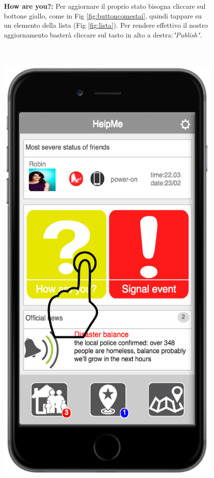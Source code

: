  
\begin{figure}
\textbf{How are you?:} Per aggiornare il proprio stato bisogna cliccare sul bottone giallo, come in Fig \ref{fig:buttoncomestai}, quindi tappare su un elemento della lista (Fig \ref{fig:lista}). Per rendere effettivo il nostro aggiornamento basterà cliccare sul tasto in alto a destra:\textit{"Publish"}.
\\ \\ \\
 \begin{minipage}[b]{6cm}
   \centering
  \includegraphics[scale=0.6]{interfaccia/tapbuttoncomestai.png}

\end{minipage}
\end{figure}
